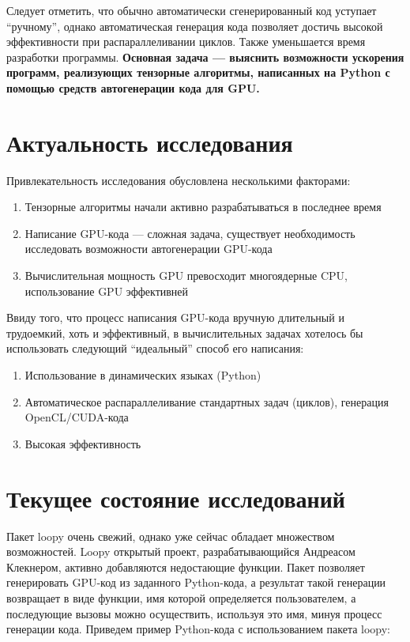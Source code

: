 \documentclass{scrartcl}
\begin{document}
Следует отметить, что обычно автоматически сгенерированный код уступает ``ручному'',
однако автоматическая генерация кода позволяет достичь высокой эффективности при распараллеливании циклов.
Также уменьшается время разработки программы.
\bfseries Основная задача --- выяснить возможности ускорения программ, реализующих тензорные алгоритмы,
написанных на Python с помощью средств автогенерации кода для GPU. \mdseries
\section{Актуальность исследования}
\label{sec-3}

Привлекательность исследования обусловлена несколькими факторами:
\begin{enumerate}
\item Тензорные алгоритмы начали активно разрабатываться в последнее время
\item Написание GPU-кода --- сложная задача, существует необходимость исследовать возможности автогенерации GPU-кода
\item Вычислительная мощность GPU превосходит многоядерные CPU, использование GPU эффективней
\end{enumerate}

Ввиду того, что процесс написания GPU-кода вручную длительный и трудоемкий, хоть и эффективный,
 в вычислительных задачах хотелось бы использовать следующий ``идеальный'' способ его написания:
\begin{enumerate}
\item Использование в динамических языках (Python)
\item Автоматическое распараллеливание стандартных задач (циклов), генерация OpenCL/CUDA-кода
\item Высокая эффективность
\end{enumerate}
\section{Текущее состояние исследований}
\label{sec-4}

Пакет loopy очень свежий, однако уже сейчас обладает множеством возможностей.
Loopy открытый проект, разрабатывающийся Андреасом Клекнером, активно добавляются недостающие функции.
Пакет позволяет генерировать GPU-код из заданного Python-кода, а результат такой генерации
возвращает в виде функции, имя которой определяется пользователем, а последующие вызовы
можно осуществить, используя это имя, минуя процесс генерации кода.
 Приведем пример Python-кода с использованием пакета loopy:
\end{document}
